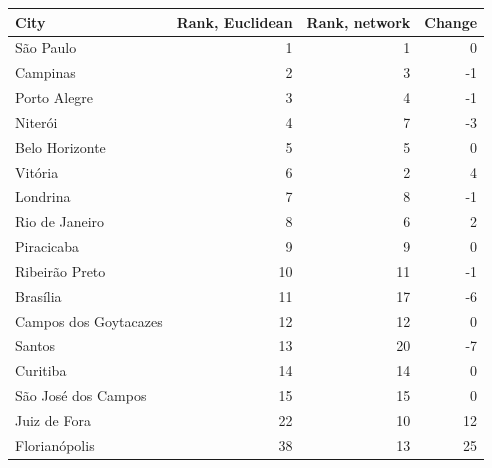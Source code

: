 \begin{tabular}{lrrr}
\toprule
City & Rank, Euclidean & Rank, network & Change \\
\midrule
São Paulo & 1 & 1 & 0 \\
Campinas & 2 & 3 & -1 \\
Porto Alegre & 3 & 4 & -1 \\
Niterói & 4 & 7 & -3 \\
Belo Horizonte & 5 & 5 & 0 \\
Vitória & 6 & 2 & 4 \\
Londrina & 7 & 8 & -1 \\
Rio de Janeiro & 8 & 6 & 2 \\
Piracicaba & 9 & 9 & 0 \\
Ribeirão Preto & 10 & 11 & -1 \\
Brasília & 11 & 17 & -6 \\
Campos dos Goytacazes & 12 & 12 & 0 \\
Santos & 13 & 20 & -7 \\
Curitiba & 14 & 14 & 0 \\
São José dos Campos & 15 & 15 & 0 \\
Juiz de Fora & 22 & 10 & 12 \\
Florianópolis & 38 & 13 & 25 \\
\bottomrule
\end{tabular}
